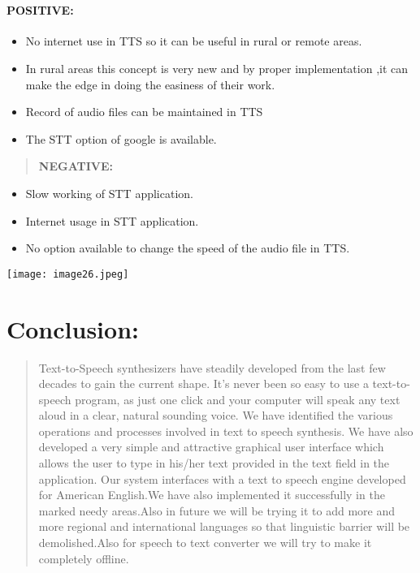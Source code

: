 \documentclass[]{article}
\let\oldparagraph\paragraph
\renewcommand{\paragraph}[1]{\oldparagraph{#1}\mbox{}}
\begin{document}
\paragraph{\texorpdfstring{\\
POSITIVE:}{ POSITIVE:}}\label{positive}

\begin{itemize}
\item
  No internet use in TTS so it can be useful in rural or remote areas.
\item
  In rural areas this concept is very new and by proper implementation
  ,it can make the edge in doing the easiness of their work.
\item
  Record of audio ﬁles can be maintained in TTS
\item
  The STT option of google is available.
\end{itemize}

\begin{quote}
\textbf{NEGATIVE:}
\end{quote}

\begin{itemize}
\item
  Slow working of STT application.
\item
  Internet usage in STT application.
\item
  No option available to change the speed of the audio ﬁle in TTS.
\end{itemize}

\texttt{[image: image26.jpeg]}

\section{Conclusion:}\label{conclusion}

\begin{quote}
Text-to-Speech synthesizers have steadily developed from the last few
decades to gain the current shape. It's never been so easy to use a
text-to-speech program, as just one click and your computer will speak
any text aloud in a clear, natural sounding voice. We have identiﬁed the
various operations and processes involved in text to speech synthesis.
We have also developed a very simple and attractive graphical user
interface which allows the user to type in his/her text provided in the
text ﬁeld in the application. Our system interfaces with a text to
speech engine developed for American English.We have also implemented it
successfully in the marked needy areas.Also in future we will be trying
it to add more and more regional and international languages so that
linguistic barrier will be demolished.Also for speech to text converter
we will try to make it completely oﬄine.
\end{quote}
\end{document}
